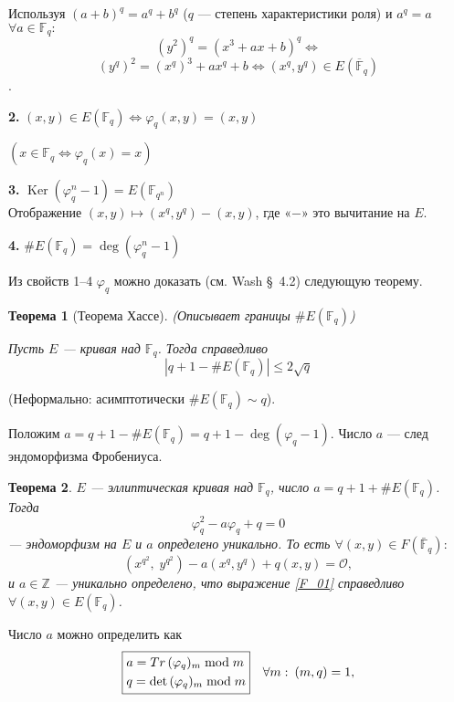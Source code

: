 \documentclass[12pt]{article}
\newcommand{\Z}{{{\mathbb Z}}}
\newcommand{\F}{{{\mathbb F}}}
\newcommand{\bigO}{\mathcal{O}}
\newtheorem{theorem}{Теорема}
\theoremstyle{definition}
\theoremstyle{definition}
\theoremstyle{definition}
\begin{document}
Используя ${( {a + b} )^q} = {a^q} + {b^q}$ ($q$ — степень характеристики роля) и ${a^q} = a$ $\forall a \in {\F_q}:$
$$
{( y^2 )^q} = (x^3 + ax + b)^q\Leftrightarrow 
$$
$$
( y^q )^2 = (x^q)^3 + a{x^q} + b \Leftrightarrow ( {x^q, y^q} ) \in E ( \overline{\F}_q )
$$. 

\textbf{2.} $( {x,y} ) \in E(\F_q) \Leftrightarrow {\varphi _q}( {x,y} ) = ( {x,y} )$

$( {x \in {\F_q} \Leftrightarrow {\varphi _q}( x ) = x} )$


\textbf{3.} $\mathop{Ker}(\varphi^n_q - 1) = E(\F_{q^n})$ \\
Отображение $( x, y ) \mapsto ( x^q, y^q ) - ( {x,y} )$, где «$-$» это вычитание на $E$.

\textbf{4.} $\# E( \F_q ) = \deg ( \varphi_q^n - 1 )$

Из свойств 1–4 ${\varphi _q}$ можно доказать (см. Wash \S~4.2) следующую теорему. 

\begin{theorem}[Теорема Хассе]
	(Описывает границы $\# E( {{\F_q}} )$)
	
	Пусть $E$ — кривая над ${\F_q}$. Тогда справедливо
	$$
	    | {q + 1 - \# E( {{\F_q}} )} | \leqslant 2\sqrt q 
	$$
\end{theorem}

(Неформально: асимптотически $\# E( {{\F_q}} )\sim q$). 

Положим $a  = q + 1 - \# E( {{\F_q}} ) = q + 1 - \deg ( {{\varphi _q} - 1} )$. Число $a$ — след эндоморфизма Фробениуса.

\begin{theorem}
	\label{theor_01}
	$E$ — эллиптическая кривая над ${\F_q}$, число $a = q + 1 + \# E(\F_q)$. Тогда 
	$$
	    \varphi _q^2 - a{\varphi _q} + q = 0
	$$
	— эндоморфизм на $E$ и $a$ определено уникально. То есть $\forall ( {x,y} ) \in F( \bar{\F}_q ):$
	\begin{equation}\label{F_01}
	( {{x^{{q^2}}},\;{y^{{q^2}}}} ) - a ( x^q, y^q ) + q( {x,y} ) = \bigO,
	\end{equation}
	и $a \in \Z$ — уникально определено, что выражение \eqref{F_01} справедливо $\forall ( {x,y} ) \in E(\F_q)$. 
\end{theorem} 

Число $a$ можно определить как
$$
    \boxed{\begin{gathered}
    a = \mathop{Tr}{( {{\varphi _q}} )_m}\bmod m \hfill \\
    q = \det {( {{\varphi _q}} )_m}\bmod m \hfill \\ 
    \end{gathered}} \quad \forall m:\:( {m,q} ) = 1,
$$
\end{document}
